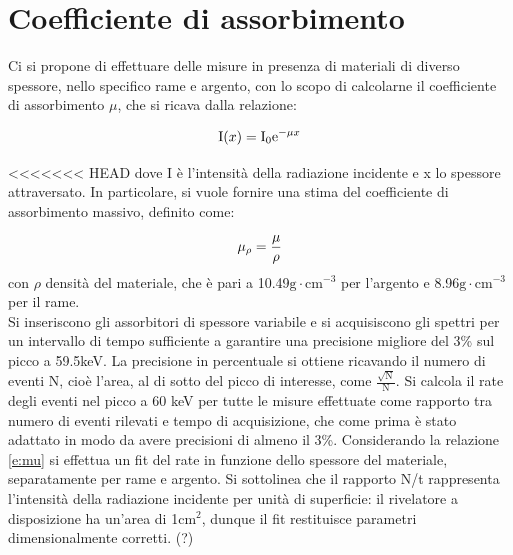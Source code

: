 \documentclass[twocolumn,10pt]{asme2ej}
\begin{document}
\cleardoublepage
\section{Coefficiente di assorbimento}\label{s:attenuazione} 

Ci si propone di effettuare delle misure in presenza di materiali di diverso spessore, nello specifico rame e argento,
con lo scopo di calcolarne il coefficiente di assorbimento $\mu$, che si ricava dalla relazione:

\vspace{-15pt}
\begin{equation}
   \text{I}(x) = \text{I}_0 \text{e}^{-\mu x}
    \vspace{-5pt}
    \label{e:mu}
\end{equation}

<<<<<<< HEAD
dove I è l'intensità della radiazione incidente e x lo spessore attraversato. In particolare, si vuole fornire una stima
del coefficiente di assorbimento massivo, definito come:

\vspace{-15pt}
\begin{equation}
   \mu_{\rho} = \frac{\mu}{\rho}
    \vspace{-5pt}
    \label{e:mu_mass}
\end{equation}
con $\rho$ densità del materiale, che è pari a 10.49$\si{\gram \cdot \centi\metre ^{-3}}$ per l'argento
e 8.96$\si{\gram \cdot \centi\metre ^{-3}}$ per il rame. 
\\ Si inseriscono gli assorbitori di spessore variabile e si acquisiscono gli spettri per
un intervallo di tempo sufficiente a garantire una precisione migliore del 3\% sul picco a 59.5keV.
La precisione in percentuale si ottiene ricavando il numero di eventi N, cioè l'area, al di sotto del
picco di interesse, come $\frac{\sqrt{\text{N}}}{\text{N}}$. 
Si calcola il rate degli eventi nel picco a 60 keV per tutte le misure effettuate come rapporto tra numero di 
eventi rilevati e tempo di acquisizione, che come prima è stato adattato in modo da avere precisioni di almeno il 3\%.
Considerando la relazione \autoref{e:mu} si effettua un fit del rate in funzione dello spessore del materiale, 
separatamente per rame e argento. Si sottolinea che il rapporto N/t rappresenta l'intensità della radiazione incidente
per unità di superficie: il rivelatore a disposizione ha un'area di 1$\si{\centi\metre}^2$, dunque il fit restituisce 
parametri dimensionalmente corretti. (?) \\
\end{document}
